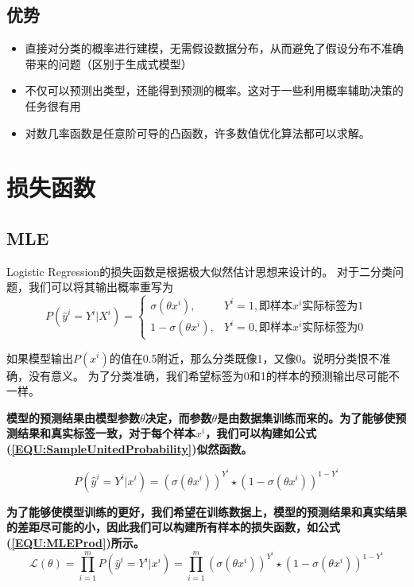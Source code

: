 \documentclass{article}
\begin{document}
\subsection{优势}
\begin{itemize}
    \item 直接对分类的概率进行建模，无需假设数据分布，从而避免了假设分布不准确带来的问题（区别于生成式模型）
    \item 不仅可以预测出类型，还能得到预测的概率。这对于一些利用概率辅助决策的任务很有用
    \item 对数几率函数是任意阶可导的凸函数，许多数值优化算法都可以求解。
\end{itemize}

\section{损失函数}

\subsection{MLE}
Logistic Regression的损失函数是根据极大似然估计思想来设计的。
对于二分类问题，我们可以将其输出概率重写为
\begin{equation}
    P(\hat{y}^i = Y^i | X^i) = \begin{cases}
        \sigma(\theta x^i),& Y^i=1,\text{即样本$x^i$实际标签为1}\\
        1-\sigma(\theta x^i),& Y^i = 0, \text{即样本$x^i$实际标签为0}
    \end{cases}
\end{equation}

如果模型输出$P(x^i)$的值在0.5附近，那么分类既像1，又像0。说明分类恨不准确，没有意义。
为了分类准确，我们希望标签为0和1的样本的预测输出尽可能不一样。

\textbf{模型的预测结果由模型参数$\theta$决定，而参数$\theta$是由数据集训练而来的。为了能够使预测结果和真实标签一致，对于每个样本$x^i$，我们可以构建如公式(\ref{EQU:SampleUnitedProbability})似然函数。}

\begin{equation}
    P(\hat{y}^i = Y^i | x^i) = (\sigma(\theta x^i))^{Y^i} \star (1-\sigma(\theta x^i))^{1-Y^i}
    \label{EQU:SampleUnitedProbability}
\end{equation}

\textbf{为了能够使模型训练的更好，我们希望在训练数据上，模型的预测结果和真实结果的差距尽可能的小，因此我们可以构建所有样本的损失函数，如公式(\ref{EQU:MLEProd})所示。}
\begin{equation}
    \mathcal{L}(\theta) = \prod^m_{i=1} P(\hat{y}^i = Y^i |x^i)=\prod^m_{i=1} (\sigma(\theta x^i))^{Y^i} \star (1-\sigma(\theta x^i))^{1-Y^i}
    \label{EQU:MLEProd}
\end{equation}
\end{document}
